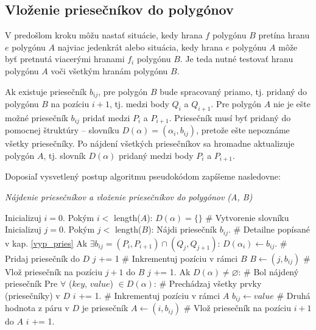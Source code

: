 \documentclass[11pt]{article}
\begin{document}
\subsection{Vloženie priesečníkov do polygónov}
V predošlom kroku môžu nastať situácie, kedy hrana $f$ polygónu $B$ pretína hranu $e$ polygónu $A$ najviac jedenkrát alebo situácia, kedy hrana $e$ polygónu $A$ môže byť pretnutá viacerými \linebreak hranami $f_i$ polygónu $B$. Je teda nutné testovať hranu polygónu $A$ voči všetkým hranám \linebreak polygónu $B$. 

Ak existuje priesečník $b_{ij}$, pre polygón $B$ bude spracovaný priamo, tj. pridaný do polygónu $B$ na pozíciu $i+1$, tj. medzi body $Q_{i}$ a $Q_{i+1}$. Pre polygón $A$ nie je ešte možné priesečník $b_{ij}$ pridať medzi $P_{i}$ a $P_{i+1}$. Priesečník musí byť pridaný do pomocnej štruktúry -- slovníku $D(\alpha) = (\alpha_i, b_{ij})$, pretože ešte nepoznáme všetky priesečníky. Po nájdení všetkých priesečníkov sa hromadne aktualizuje polygón $A$, tj. slovník $D(\alpha)$ pridaný medzi body $P_{i}$ a $P_{i+1}$.

\noindent Doposiaľ vysvetlený postup algoritmu pseudokódom zapíšeme nasledovne:
\begin{algorithm}
    \caption {\textit{Nájdenie priesečníkov a vloženie priesečníkov do polygónov (A, B)}}
    \begin{algorithmic}[1]
        \State Inicializuj $i = 0$.
        \State Pokým $i <$ length($A$):
        \State \indent $D(\alpha) = \{\}$ \quad \quad \# Vytvorenie slovníku 
        \State \indent Inicializuj $j = 0$.
        \State \indent Pokým $j <$ length($B$):
        \State \indent \indent Nájdi priesečník $b_{ij}$. \quad \quad \# Detailne popísané v kap. \ref{vyp_pries}  
        \State \indent \indent Ak $\exists b_{ij} = (P_i, P_{i+1}) \cap (Q_j, Q_{j+1})$:
        \State \indent \indent \indent $D(\alpha_i) \gets b_{ij}$. \quad \quad \# Pridaj priesečník do $D$
        \State \indent \indent \indent $j$ += 1 \quad \quad \# Inkrementuj pozíciu v rámci $B$
        \State \indent \indent \indent $B \gets (j, b_{ij})$ \quad \quad \# Vlož priesečník na pozíciu $j+1$ do $B$
        \State \indent \indent $j$ += 1.
        \State \indent Ak $D(\alpha) \ne \varnothing$: \quad \quad \# Bol nájdený priesečník
        \State \indent \indent Pre $\forall$ ($key$, $value$)  $\in D(\alpha)$: \quad \quad \# Prechádzaj všetky prvky (priesečníky) v $D$
        \State \indent \indent \indent $i$ += 1. \quad \quad \# Inkrementuj pozíciu v rámci $A$
        \State \indent \indent \indent $b_{ij} \gets value$ \quad \quad \# Druhá hodnota z páru v $D$ je priesečník
        \State \indent \indent \indent $A \gets (i, b_{ij})$ \quad \quad \# Vlož priesečník na pozíciu $i+1$ do $A$
        \State \indent $i$ += 1.
    \end{algorithmic}
\end{algorithm}
\newpage
\end{document}

